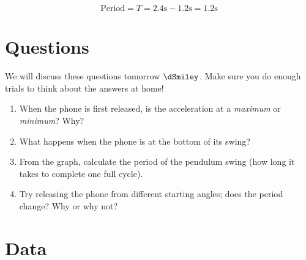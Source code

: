 \documentclass[a4paper]{article}
\begin{document}
\begin{figure}[H]
	\centering
	\qquad
	\label{fig:example}%
\end{figure}

\begin{equation}
	\text{Period} = T = 2.4\text{s} - 1.2\text{s} = 1.2\text{s}
\end{equation}


\section{Questions}

We will discuss these questions tomorrow $\dSmiley$. Make sure you do enough trials to think about the answers at home!

\begin{enumerate}
    \item When the phone is first released, is the acceleration at a \textit{maximum} or \textit{minimum}? Why?
    \item What happens when the phone is at the bottom of its swing?
    \item From the graph, calculate the period of the pendulum swing (how long it takes to complete one full cycle).
    \item Try releasing the phone from different starting angles; does the period change? Why or why not?
\end{enumerate}

\section{Data}
\end{document}
